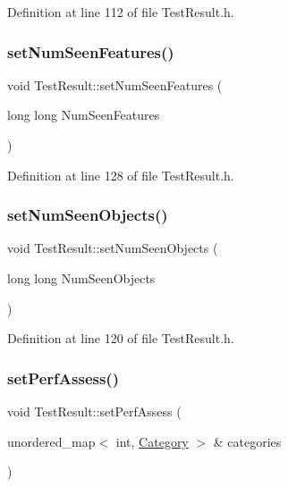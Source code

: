 Definition at line 112 of file Test\+Result.\+h.

\mbox{\label{class_test_result_a3b62eac13ac36a12454ced117e6eebe3}} 
\subsubsection{\texorpdfstring{set\+Num\+Seen\+Features()}{setNumSeenFeatures()}}
{\footnotesize\ttfamily void Test\+Result\+::set\+Num\+Seen\+Features (\begin{DoxyParamCaption}\item[{long long}]{Num\+Seen\+Features }\end{DoxyParamCaption})\hspace{0.3cm}{\ttfamily [inline]}}



Definition at line 128 of file Test\+Result.\+h.

\mbox{\label{class_test_result_a901e43703e2a09d2dd6f55fdc74f803b}} 
\subsubsection{\texorpdfstring{set\+Num\+Seen\+Objects()}{setNumSeenObjects()}}
{\footnotesize\ttfamily void Test\+Result\+::set\+Num\+Seen\+Objects (\begin{DoxyParamCaption}\item[{long long}]{Num\+Seen\+Objects }\end{DoxyParamCaption})\hspace{0.3cm}{\ttfamily [inline]}}



Definition at line 120 of file Test\+Result.\+h.

\mbox{\label{class_test_result_a0828de248f0a56eb99b24211c47db125}} 
\subsubsection{\texorpdfstring{set\+Perf\+Assess()}{setPerfAssess()}}
{\footnotesize\ttfamily void Test\+Result\+::set\+Perf\+Assess (\begin{DoxyParamCaption}\item[{unordered\+\_\+map$<$ int, \hyperlink{class_category}{Category} $>$ \&}]{categories }\end{DoxyParamCaption})}

